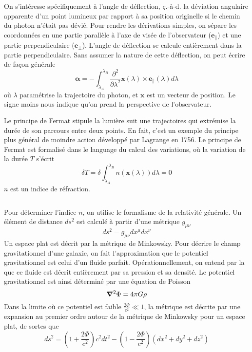 On s'intéresse spécifiquement à l'angle 
de déflection, ç.-à-d. la déviation angulaire apparente d'un point 
lumineux par rapport à sa position originelle si 
le chemin du photon n'était pas dévié. Pour rendre les dérivations simples, 
on sépare les coordonnées en une partie parallèle à l'axe de visée de l'observateur ($\mathbf{e}_\parallel$) 
et une partie perpendiculaire ($\mathbf{e}_\perp$). L'angle de déflection se calcule entièrement 
dans la partie perpendiculaire. Sans assumer la nature de cette déflection, 
on peut écrire de façon générale
\begin{equation}\label{eq:alpha}
       \boldsymbol{ \alpha} = - \int_{\lambda_A}^{\lambda_B} \frac{\partial^{2}}{\partial \lambda^{2}}\mathbf{x}(\lambda) \times \mathbf{e}_{\parallel}(\lambda) d\lambda
\end{equation}
où $\lambda$ paramétrise la trajectoire du photon, et $\mathbf{x}$ est un vecteur de 
position. Le signe moins nous indique qu'on prend la perspective de l'observateur. 

Le principe de Fermat stipule la lumière suit une trajectoires qui extrémise
la durée de son parcours entre deux points. 
En fait, c'est un exemple du principe 
plus général de moindre action développé par Lagrange en 1756. 
Le principe de Fermat est formalisé dans le language du calcul 
des variations, où la variation de la durée $T$ s'écrit
\begin{equation}\label{eq:Fermat}
       \delta T =  \delta \int_{\lambda_A}^{\lambda_B} n(\mathbf{x}(\lambda))d\lambda = 0 
\end{equation} 
$n$ est un indice de réfraction.


\begin{equation}\label{eq:deflection true}
\end{equation} 


Pour déterminer l'indice $n$, on utilise le formalisme de la relativité 
générale. Un élément de distance $ds^2$ est calculé à partir d'une métrique $g_{\mu \nu}$ 
\begin{equation}\label{eq:ds}
        ds^2 = g_{\mu \nu}dx^{\mu}dx^{\nu}
\end{equation} 
Un espace plat est décrit par la métrique de Minkowsky. Pour décrire le champ 
gravitationnel d'une galaxie, on fait l'approximation que le potentiel gravitationnel 
est celui d'un fluide parfait. Opérationnellement, on entend par la que ce fluide est décrit entièrement 
par sa pression et sa densité. Le potentiel gravitationnel est ainsi déterminé 
par une équation de Poisson 
\begin{equation}\label{eq:Poisson}
       \grad^{2}\Phi = 4\pi G \rho 
\end{equation} 
Dans la limite où ce potentiel est faible $\displaystyle \frac{2\Phi}{c^{2}} \ll 1$, la 
métrique est décrite par une expansion au premier ordre autour de la 
métrique de Minkowsky pour un espace plat, de sortes que
\begin{equation}\label{eq:newton}
        ds^2 = \left( 1 + \frac{2\Phi}{c^{2}} \right)c^{2}dt^{2} - \left( 1 - \frac{2\Phi}{c^{2}} \right)(dx^{2} + dy^{2} + dz^{2})
\end{equation} 

